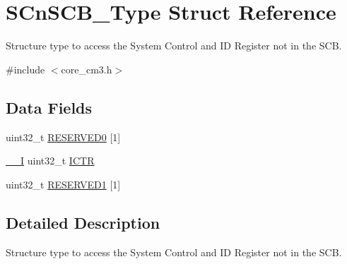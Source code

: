 \hypertarget{structSCnSCB__Type}{\section{S\-Cn\-S\-C\-B\-\_\-\-Type Struct Reference}
\label{structSCnSCB__Type}
}


Structure type to access the System Control and I\-D Register not in the S\-C\-B.  




{\ttfamily \#include $<$core\-\_\-cm3.\-h$>$}

\subsection*{Data Fields}
\begin{DoxyCompactItemize}
\item 
uint32\-\_\-t \hyperlink{structSCnSCB__Type_afe1d5fd2966d5062716613b05c8d0ae1}{R\-E\-S\-E\-R\-V\-E\-D0} \mbox{[}1\mbox{]}
\item 
\hyperlink{core__cm3_8h_af63697ed9952cc71e1225efe205f6cd3}{\-\_\-\-\_\-\-I} uint32\-\_\-t \hyperlink{structSCnSCB__Type_ad99a25f5d4c163d9005ca607c24f6a98}{I\-C\-T\-R}
\item 
uint32\-\_\-t \hyperlink{structSCnSCB__Type_a7343aadfc9e7a15e58c26b67c5d576c1}{R\-E\-S\-E\-R\-V\-E\-D1} \mbox{[}1\mbox{]}
\end{DoxyCompactItemize}


\subsection{Detailed Description}
Structure type to access the System Control and I\-D Register not in the S\-C\-B. 

